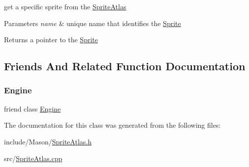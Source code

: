 get a specific sprite from the \hyperlink{class_mason_1_1_sprite_atlas}{Sprite\+Atlas} 


\begin{DoxyParams}{Parameters}
{\em name} & unique name that identifies the \hyperlink{class_mason_1_1_sprite}{Sprite} \\
\hline
\end{DoxyParams}
\begin{DoxyReturn}{Returns}
a pointer to the \hyperlink{class_mason_1_1_sprite}{Sprite} 
\end{DoxyReturn}


\subsection{Friends And Related Function Documentation}
\hypertarget{class_mason_1_1_sprite_atlas_a3e1914489e4bed4f9f23cdeab34a43dc}{}\label{class_mason_1_1_sprite_atlas_a3e1914489e4bed4f9f23cdeab34a43dc} 
\subsubsection{\texorpdfstring{Engine}{Engine}}
{\footnotesize\ttfamily friend class \hyperlink{class_mason_1_1_engine}{Engine}\hspace{0.3cm}{\ttfamily [friend]}}



The documentation for this class was generated from the following files\+:\begin{DoxyCompactItemize}
\item 
include/\+Mason/\hyperlink{_sprite_atlas_8h}{Sprite\+Atlas.\+h}\item 
src/\hyperlink{_sprite_atlas_8cpp}{Sprite\+Atlas.\+cpp}\end{DoxyCompactItemize}
